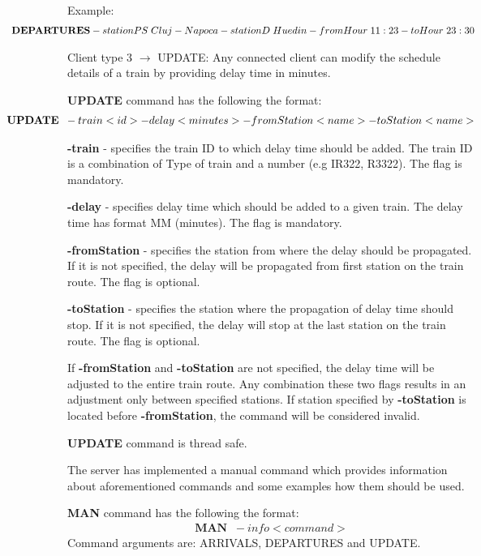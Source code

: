 \documentclass[runningheads]{llncs}
\begin{document}
\par Example:
\begin{gather*}
   \hspace*{-2cm}\textbf{DEPARTURES}  -stationPS  \; Cluj-Napoca -stationD  \; Huedin -fromHour \; 11:23 -toHour \; 23:30
\end{gather*}

\par Client type 3 $\rightarrow$ UPDATE: Any connected client can modify the schedule details of a train by providing delay time in minutes.

\textbf{UPDATE} command has the following the format:  
\begin{gather*}
   \hspace*{-2cm}\textbf{UPDATE} \;\;-train <id> -delay <minutes> -fromStation <name> -toStation <name>
\end{gather*}

\textbf{-train} - specifies the train ID to which delay time should be added. The train ID is a combination of Type of train and a number (e.g IR322, R3322). The flag is mandatory.

\textbf{-delay} - specifies delay time which should be added to a given train. The delay time has format MM (minutes). The flag is mandatory.

\textbf{-fromStation} - specifies the station from where the delay should be propagated. If it is not specified, the delay will be propagated from first station on the train route. The flag is optional.

\textbf{-toStation} - specifies the station where the propagation of delay time should stop. If it is not specified, the delay will stop at the last station on the train route. The flag is optional.

If \textbf{-fromStation} and \textbf{-toStation} are not specified, the delay time will be adjusted to the entire train route. Any combination these two flags results in an adjustment only between specified stations. If station specified by  \textbf{-toStation} is located before \textbf{-fromStation}, the command will be considered invalid.

\textbf{UPDATE} command is thread safe.

The server has implemented a manual command which provides information about aforementioned commands and some examples how them should be used.

\textbf{MAN} command has the following the format:  
\begin{gather*}
    \textbf{MAN} \;\;-info <command>
\end{gather*}
Command arguments are: ARRIVALS, DEPARTURES and UPDATE.
\end{document}
